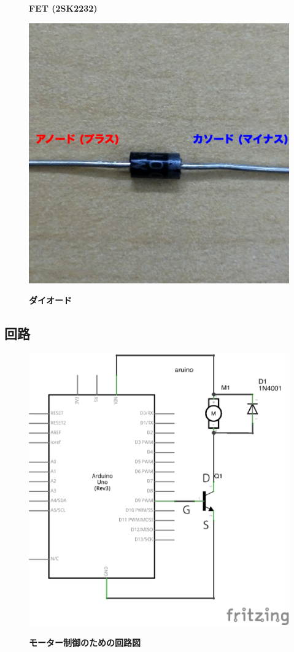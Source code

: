 \documentclass[11pt,a4paper]{jarticle}
\begin{document}
\begin{figure}[h!]
\begin{minipage}{0.32\columnwidth}
  \begin{center}
   \textbf{FET (2SK2232)}
  \end{center}
 \end{minipage}
 \begin{minipage}{0.32\columnwidth}
  \centering
  \includegraphics[width=\columnwidth]{img/diode.eps}
  \begin{center}
   \textbf{ダイオード}
  \end{center}
 \end{minipage}
\end{figure}

\newpage

\subsection*{回路}
\begin{figure}[h!]
 \centering
 \includegraphics[width=0.5\columnwidth]{img/motor_control_circuit.eps}
 \begin{center}
  \textbf{モーター制御のための回路図}
 \end{center}
\end{figure}
\end{document}
